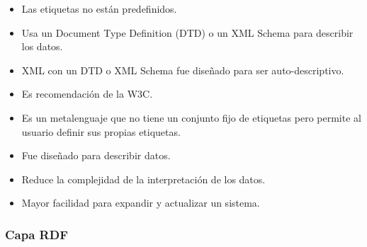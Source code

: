 \documentclass[a4paper,12pt,twoside,final,spanish]{article}
\begin{document}
\begin{itemize}
\item Las etiquetas no están predefinidos.
\item Usa un Document Type Definition (DTD) o un XML Schema para describir los datos.
\item XML con un DTD o XML Schema fue diseñado para ser auto-descriptivo.
\item Es recomendación de la W3C.
\item Es un metalenguaje que no tiene un conjunto fijo de etiquetas pero permite al usuario definir sus propias etiquetas.
\item Fue diseñado para describir datos.
\item Reduce la complejidad de la interpretación de los datos.
\item Mayor facilidad para expandir y actualizar un sistema.
\end{itemize}

\subsubsection{Capa RDF}
\end{document}
